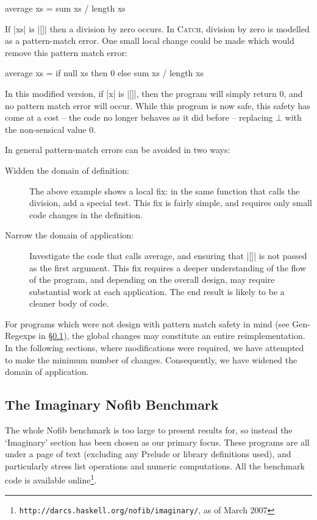 \documentclass[preprint]{sigplanconf}
\newcommand{\C}[1]{\textsf{#1}}
\newcommand{\catch}{\textsc{Catch}}
\begin{document}
\begin{code}
average xs = sum xs / length xs
\end{code}

If |xs| is |[]| then a division by zero occurs. In \catch{}, division by zero is modelled as a pattern-match error. One small local change could be made which would remove this pattern match error:

\begin{code}
average xs = if null xs then 0 else sum xs / length xs
\end{code}

In this modified version, if |x| is |[]|, then the program will simply return 0, and no pattern match error will occur. While this program is now safe, this safety has come at a cost -- the code no longer behaves as it did before -- replacing $\bot{}$ with the non-sensical value 0.

In general pattern-match errors can be avoided in two ways:

\begin{description}
\item [Widden the domain of definition:] The above example shows a local fix: in the same function that calls the division, add a special test. This fix is fairly simple, and requires only small code changes in the definition.

\item [Narrow the domain of application:] Investigate the code that calls \C{average}, and ensuring that |[]| is not passed as the first argument. This fix requires a deeper understanding of the flow of the program, and depending on the overall design, may require substantial work at each application. The end result is likely to be a cleaner body of code.
\end{description}

For programs which were not design with pattern match safety in mind (see Gen-Regexps in \S\ref{sec:imaginary}), the global changes may constitute an entire reimplementation. In the following sections, where modifications were required, we have attempted to make the minimum number of changes. Consequently, we have widened the domain of application.

\subsection{The Imaginary Nofib Benchmark}
\label{sec:imaginary}

The whole Nofib benchmark \citep{nofib} is too large to present results for, so instead the `Imaginary' section has been chosen as our primary focus. These programs are all under a page of text (excluding any Prelude or library definitions used), and particularly stress list operations and numeric computations. All the benchmark code is available online\footnote{\texttt{http://darcs.haskell.org/nofib/imaginary/}, as of March 2007}.
\end{document}
